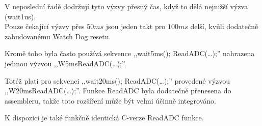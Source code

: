 V neposlední řadě dodržují tyto výzvy přesný čas, když to dělá nejnižší výzva (wait1us).
\\Pouze čekající výzvy přes \(50ms\) jsou jeden takt pro \(100ms\) delší, kvůli dodatečně zabudovanému
Watch Dog resetu.


Kromě toho byla často používá sekvence ,,wait5ms(); ReadADC(\dots);'' nahrazena jedinou výzvou ,,W5msReadADC(\dots);''.

Totéž platí pro sekvenci ,,wait20ms(); ReadADC(\dots);'' provedené výzvou
,,W20msReadADC(\dots);''.
Funkce ReadADC byla dodatečně přenesena do assembleru, takže toto rozšíření
může být velmi účinně integrováno.

K dispozici je také funkčně identická C-verze ReadADC funkce.
